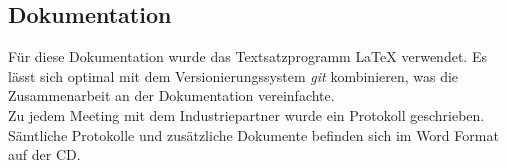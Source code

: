 \subsection{Dokumentation}
Für diese Dokumentation wurde das Textsatzprogramm {\LaTeX} verwendet. Es lässt sich optimal mit dem Versionierungssystem \textit{\gls{git}} kombinieren, was die Zusammenarbeit an der Dokumentation vereinfachte.
\\

Zu jedem Meeting mit dem Industriepartner wurde ein Protokoll geschrieben. Sämtliche Protokolle und zusätzliche Dokumente befinden sich im Word Format auf der CD.